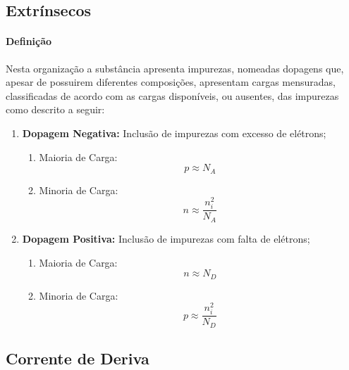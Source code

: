 \documentclass{article}
\begin{document}
        \subsection{Extrínsecos}
            \paragraph{Definição}Nesta organização a substância apresenta impurezas, nomeadas dopagens que, apesar de possuirem diferentes composições, apresentam cargas mensuradas, classificadas de acordo com as cargas disponíveis, ou ausentes, das impurezas como descrito a seguir: 
                \begin{enumerate}
                    \item \textbf{Dopagem Negativa:} Inclusão de impurezas com excesso de elétrons;
                        \begin{enumerate}[noitemsep]
                            \item Maioria de Carga:
                                \[
                                    p \approx N_{A}
                                \]
                            \item Minoria de Carga:
                                \[
                                    n \approx \frac{n_{i}^{2}}{N_{A}}
                                \]
                        \end{enumerate}
                    \item \textbf{Dopagem Positiva:} Inclusão de impurezas com falta de elétrons;
                        \begin{enumerate}[noitemsep]
                            \item Maioria de Carga:
                                \[
                                    n \approx N_{D}
                                \]
                            \item Minoria de Carga:
                                \[
                                    p \approx \frac{n_{i}^{2}}{N_{D}}
                                \]
                        \end{enumerate}
                \end{enumerate}

        \subsection{Corrente de Deriva}
\end{document}
